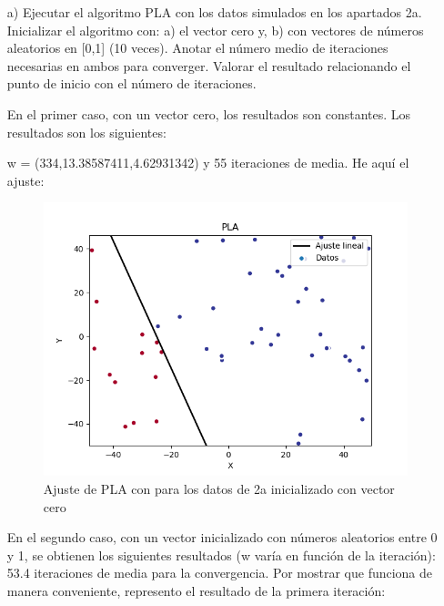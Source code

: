 \begin{itemize}
	\item[a)] Ejecutar el algoritmo PLA con los datos simulados en los apartados 2a. Inicializar el algoritmo con: a) el vector cero y, b) con vectores de números aleatorios en [0,1] (10 veces). Anotar el número medio de iteraciones necesarias en ambos para converger. Valorar el resultado relacionando el punto de inicio con el número de iteraciones.
	
	En el primer caso, con un vector cero, los resultados son constantes. Los resultados son los siguientes:
	
	 w =  (334,13.38587411,4.62931342) y 55 iteraciones de media. He aquí el ajuste:
	
	\begin{figure}[H] %
		\centering
		\includegraphics[scale=0.5]{PLA1.png}  %
		\caption{Ajuste de PLA con para los datos de 2a inicializado con vector cero} 
		\label{fig:pla1}
	\end{figure}

	En el segundo caso, con un vector inicializado con números aleatorios entre 0 y 1, se obtienen los siguientes resultados (w varía en función de la iteración): 53.4 iteraciones de media para la convergencia. Por mostrar que funciona de manera conveniente, represento el resultado de la primera iteración:
	

\end{itemize}
